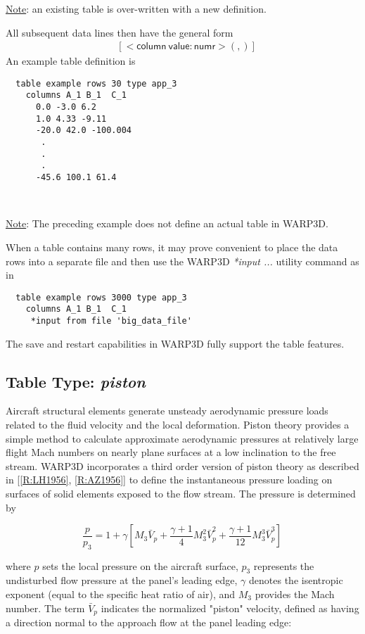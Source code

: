 \documentclass[11pt]{report}
\numberwithin{equation}{section}
\newcommand{\ul} {\underline}
\newcommand{\hv} {\mathsf}   %
\newcommand{\ti}{\emph}
\newcommand{\noi}{\noindent}
\begin{document}
\noi \ul{Note}: an existing table is over-written with a new definition.

All subsequent data lines then have the general form
\begin{align*}
& \hv{[ <column\ value: numr> (,) ] }
\end{align*}
\noi An example table definition is 
\small
\begin{verbatim}
  table example rows 30 type app_3
    columns A_1 B_1  C_1
      0.0 -3.0 6.2
      1.0 4.33 -9.11
      -20.0 42.0 -100.004
       .
       .
       .
      -45.6 100.1 61.4
\end{verbatim}
\normalsize
\

\noi \ul{Note}: The preceding example does not define an actual table in WARP3D.

\noi When a table contains many rows, it may prove convenient
to place the data rows into a separate file and then use the 
WARP3D \ti{*input ...} utility command as in
\small
\begin{verbatim}
  table example rows 3000 type app_3
    columns A_1 B_1  C_1
     *input from file 'big_data_file'
\end{verbatim}
\normalsize

The save and restart capabilities in WARP3D fully support the table features.

\subsection{Table Type: \ti{piston}}

\noindent Aircraft structural elements generate unsteady aerodynamic pressure loads 
related to the fluid velocity and the local deformation. Piston theory provides
a simple method to calculate approximate aerodynamic pressures at relatively large
flight Mach numbers on nearly plane surfaces at a low inclination to the free stream. 
WARP3D incorporates a third order version of piston theory as described 
in [\ref{R:LH1956}, \ref{R:AZ1956}] to
define the instantaneous pressure loading on surfaces of solid elements exposed
to the flow stream. The pressure is determined by

\begin{equation}\label{eqn:3rdpist}
\dfrac{p}{p_3} = 1 + \gamma \left[ M_3 \bar{V}_p
+ \dfrac{\gamma+1}{4} M_3^2 \bar{V}_p^2 
+ \dfrac{\gamma+1}{12} M_3^3 \bar{V}_p^3 
\right] \,
\end{equation}

\noindent where $p$ sets the local pressure on the aircraft surface, 
$p_3$ represents the undisturbed flow pressure at the panel's leading edge, $\gamma$ denotes 
the isentropic exponent (equal to the specific heat ratio of air), 
and $M_3$ provides the Mach number. The term $\bar{V}_p$ indicates
the normalized "piston" velocity, defined as having a 
direction normal to the approach flow at the panel leading edge:
\end{document}

